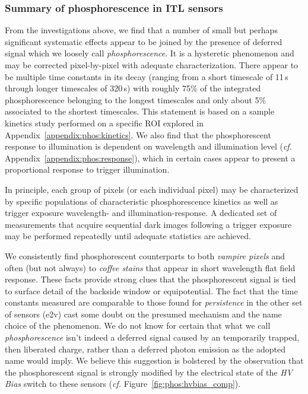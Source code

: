 \subsubsection{Summary of phosphorescence in ITL sensors}
From the investigations above, we find that a number of small but perhaps significant systematic effects appear to be joined by the presence of deferred signal which we loosely call {\it phosphorescence}. It is a hysteretic phenomenon and may be corrected pixel-by-pixel with adequate characterization. There appear to be multiple time constants in its decay (ranging from a short timescale of 11\,s through longer timescales of 320\,s) with roughly 75\% of the integrated phosphorescence belonging to the longest timescales and only about 5\% associated to the shortest timescales. This statement is based on a sample kinetics study performed on a specific ROI explored in Appendix~\ref{appendix:phos:kinetics}. We also find that the phosphorescent response to illumination is dependent on wavelength and illumination level ({\it cf.} Appendix~\ref{appendix:phos:response}), which in certain cases appear to present a proportional response to trigger illumination.

In principle, each group of pixels (or each individual pixel) may be characterized by specific populations of characteristic phosphorescence kinetics as well as trigger exposure wavelength- and illumination-response. A dedicated set of measurements that acquire sequential dark images following a trigger exposure may be performed repeatedly until adequate statistics are achieved. 

We consistently find phosphorescent counterparts to both {\it vampire pixels} and often (but not always) to {\it coffee stains} that appear in short wavelength flat field response. These facts provide strong clues that the phosphorescent signal is tied to surface detail of the backside window or equipotential. The fact that the time constants measured are comparable to those found for {\it persistence} in the other set of sensors (e2v) cast some doubt on the presumed mechanism and the name choice of the phenomenon. We do not know for certain that what we call {\it phosphorescence} isn't indeed a deferred signal caused by an temporarily trapped, then liberated charge, rather than a deferred photon emission as the adopted name would imply. We believe this suggestion is bolstered by the observation that the phosphorescent signal is strongly modified by the electrical state of the {\it HV Bias} switch to these sensors ({\it cf.} Figure~\ref{fig:phos:hvbias_comp}).


